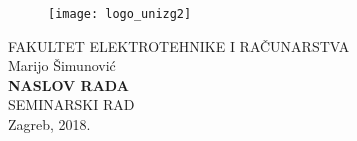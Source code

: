 \documentclass[12pt,oneside, a4paper]{article}
\begin{document}
\begin{titlepage}
  \fontsize{16pt}{20pt}\selectfont
  \selectfont
  \setlength{\intextsep}{0pt plus 0pt minus 0pt}

  \begin{center}
    \begin{figure}[ht!]
      \begin{center}
        \texttt{[image: logo\_unizg2]}
      \end{center}
    \end{figure}		
    \vspace{0cm}
    {FAKULTET ELEKTROTEHNIKE I RAČUNARSTVA} \\
    \vspace{3cm}
    Marijo Šimunović \\
    \vspace{2cm}
    {\fontsize{22pt}{22pt}\selectfont\textbf{NASLOV RADA}} \\
    \vspace{2cm}    
    SEMINARSKI RAD \\
    \vspace{5cm}    %
    \vfill{Zagreb, 2018.}
  \end{center}
  \restoregeometry
\end{titlepage}

\tableofcontents
\clearpage
\listoffigures
\clearpage
\listoftables
\clearpage


\clearpage


\clearpage


\clearpage


\clearpage


\clearpage

 




\end{document}
